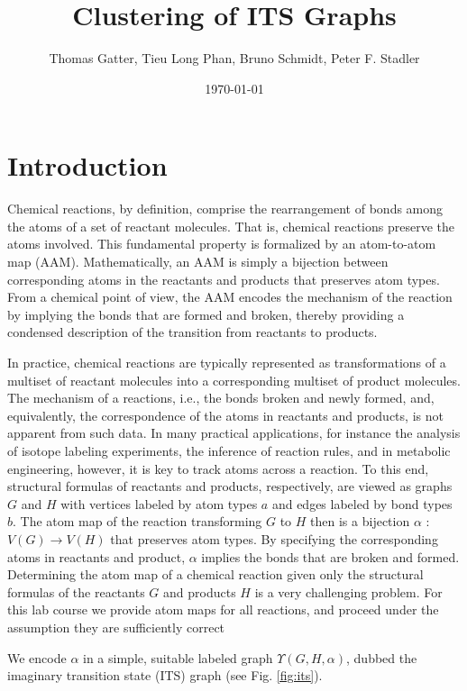 \documentclass[a4,12pt]{article}
\theoremstyle{plain}
\numberwithin{theorem}{section}
\begin{document}
\title{Clustering of ITS Graphs}
\author{Thomas Gatter, Tieu Long Phan, Bruno Schmidt, Peter F. Stadler}
\date{\today}
\maketitle


\section{Introduction}

Chemical reactions, by definition, comprise the rearrangement of bonds
among the atoms of a set of reactant molecules. That is, chemical reactions
preserve the atoms involved. This fundamental property is formalized by an
atom-to-atom map (AAM). Mathematically, an AAM is simply a bijection
between corresponding atoms in the reactants and products that preserves
atom types. From a chemical point of view, the AAM encodes the
mechanism of the reaction by implying the bonds that are formed and
broken, thereby providing a condensed description of the transition from
reactants to products.

In practice, chemical reactions are typically
represented as transformations of a multiset of reactant
molecules into a corresponding multiset of product molecules. The
mechanism of a reactions, i.e., the bonds broken and newly formed, and,
equivalently, the correspondence of the atoms in reactants and products, is
not apparent from such data. In many practical applications, for instance
the analysis of isotope labeling experiments, the inference of reaction
rules, and in metabolic engineering, however, it is key to track
atoms across a reaction. To this end, structural formulas of reactants and
products, respectively, are viewed as graphs $G$ and $H$ with vertices labeled
by atom types $a$ and edges labeled by bond types $b$. The atom map of the
reaction transforming $G$ to $H$ then is a bijection $\alpha$ : $V(G) \rightarrow V(H)$ that
preserves atom types. By specifying the corresponding atoms in reactants
and product, $\alpha$ implies the bonds that are broken and formed. 
Determining the atom map of a chemical reaction given only the structural
formulas of the reactants $G$ and products $H$ is a very challenging problem.
For this lab course we provide atom maps for all reactions, and proceed under the assumption they are sufficiently correct

We encode $\alpha$ in a simple, suitable labeled graph $\Upsilon(G, H, \alpha)$,
dubbed the imaginary transition state (ITS) graph (see Fig. \ref{fig:its}).\\
\end{document}
